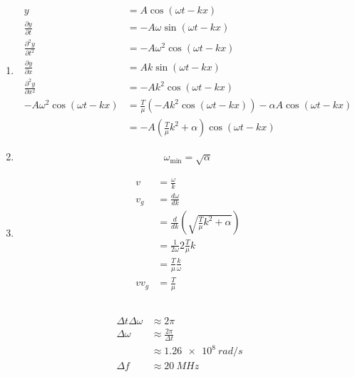 \documentclass{article}
\begin{document}
\begin{enumerate}
  \item

        \begin{align*}
          y                                 & = A \cos (\omega t - k x)                                                       \\
          \frac{\partial y}{\partial t}     & = -A \omega \sin (\omega t - k x)                                               \\
          \frac{\partial^2 y}{\partial t^2} & = -A \omega^2 \cos (\omega t - k x)                                             \\
          \frac{\partial y}{\partial x}     & = A k \sin (\omega t - k x)                                                     \\
          \frac{\partial^2 y}{\partial x^2} & = -A k^2 \cos (\omega t - k x)                                                  \\
          -A \omega^2 \cos (\omega t - k x) & = \frac{T}{\mu} (-A k^2 \cos (\omega t - k x)) - \alpha A \cos (\omega t - k x) \\
                                            & = -A \left( \frac{T}{\mu} k^2 + \alpha \right) \cos (\omega t - k x)
        \end{align*}

  \item \[\omega_\text{min} = \sqrt{\alpha}\]

  \item

        \begin{align*}
          v     & = \frac{\omega}{k}                                               \\
          v_g   & = \frac{d \omega}{d k}                                           \\
                & = \frac{d}{d k} \left( \sqrt{\frac{T}{\mu} k^2 + \alpha} \right) \\
                & = \frac{1}{2 \omega} 2 \frac{T}{\mu} k                           \\
                & = \frac{T}{\mu} \frac{k}{\omega}                                 \\
          v v_g & = \frac{T}{\mu}
        \end{align*}
\end{enumerate}

\subsection{}

\begin{align*}
  \Delta t \Delta \omega & \approx 2 \pi                  \\
  \Delta \omega          & \approx \frac{2 \pi}{\Delta t} \\
                         & \approx \qty{1.26e8}{rad/s}    \\
  \Delta f               & \approx \qty{20}{MHz}
\end{align*}
\end{document}
